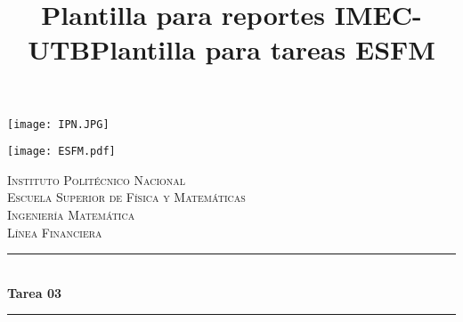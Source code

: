 \documentclass[10pt]{article}\usepackage[]{graphicx}\usepackage[]{color}
\title{Plantilla para reportes IMEC-UTB}
\title{Plantilla para tareas ESFM}
\begin{document}
\begin{center}																		%
\newcommand{\HRule}{\rule{\linewidth}{0.5mm}}									%
\begin{minipage}{0.48\textwidth} \begin{flushleft}
\texttt{[image: IPN.JPG]}
\end{flushleft}\end{minipage}
\begin{minipage}{0.48\textwidth} \begin{flushright}
\texttt{[image: ESFM.pdf]}
\end{flushright}\end{minipage}

\vspace*{1.0cm}								%
\textsc{\huge Instituto Politécnico Nacional \\ \vspace{5px} Escuela Superior de Física y Matemáticas}\\[1.5cm]	

\textsc{\LARGE  Ingeniería Matemática \\ \vspace{5px} Línea Financiera }\\[1.5cm]													%


 			\vspace*{1cm}																		%
\HRule \\[0.4cm]																	%
{ \huge \bfseries Tarea 03}\\[0.4cm]	%
\HRule \\[1 cm]																	%
\begin{minipage}{0.46\textwidth}													%
\begin{flushleft} \large															%


\end{flushleft}
\end{minipage}
\end{center}
\end{document}
